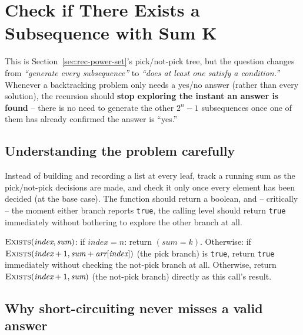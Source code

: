 \section{Check if There Exists a Subsequence with Sum K}
\label{sec:rec-check-subsequence-sum-k}


\begin{patternbox}
This is Section~\ref{sec:rec-power-set}'s pick/not-pick tree, but the
question changes from \emph{``generate every subsequence''} to
\emph{``does at least one satisfy a condition.''} Whenever a backtracking
problem only needs a yes/no answer (rather than every solution), the
recursion should \textbf{stop exploring the instant an answer is found}
-- there is no need to generate the other $2^n-1$ subsequences once one
of them has already confirmed the answer is ``yes.''
\end{patternbox}

\subsection*{Understanding the problem carefully}

Instead of building and recording a list at every leaf, track a running
sum as the pick/not-pick decisions are made, and check it only once
every element has been decided (at the base case). The function should
return a boolean, and -- critically -- the moment either branch reports
\texttt{true}, the calling level should return \texttt{true} immediately
without bothering to explore the other branch at all.

\begin{ideabox}
$\textsc{Exists}(\textit{index}, \textit{sum})$: if
$\textit{index} = n$: return $(\textit{sum} = k)$. Otherwise: if
$\textsc{Exists}(\textit{index}+1, \textit{sum} +
\textit{arr}[\textit{index}])$ (the pick branch) is \texttt{true}, return
\texttt{true} immediately without checking the not-pick branch at all.
Otherwise, return $\textsc{Exists}(\textit{index}+1, \textit{sum})$ (the
not-pick branch) directly as this call's result.
\end{ideabox}

\subsection*{Why short-circuiting never misses a valid answer}


